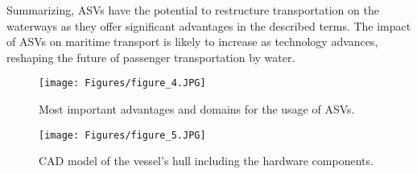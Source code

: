 Summarizing, ASVs have the potential to restructure transportation on the waterways as they offer significant advantages in the described terms. The impact of ASVs on maritime transport is likely to increase as technology advances, reshaping the future of passenger transportation by water.
\begin{figure}[]
	\centering 
	\texttt{[image: Figures/figure\_4.JPG]}	
	\caption{Most important advantages and domains for the usage of ASVs.} 
	\label{fig_domains}%
\end{figure}
  \begin{figure}[b!]
	\centering 
	\texttt{[image: Figures/figure\_5.JPG]}	
	\caption{CAD model of the vessel's hull including the hardware components.} 
	\label{fig_hull}%
\end{figure}
